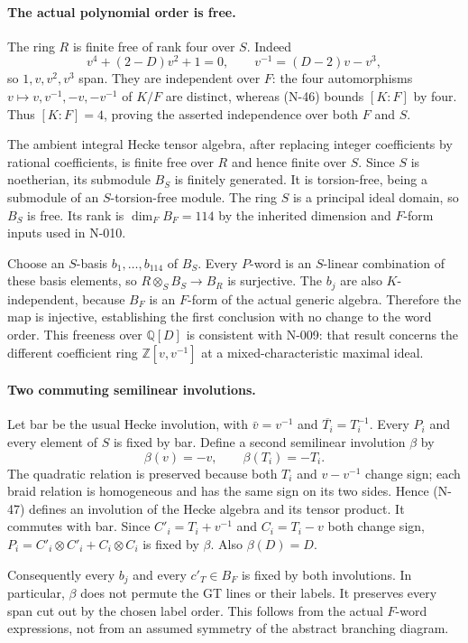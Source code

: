\paragraph{The actual polynomial order is free.}
The ring $R$ is finite free of rank four over $S$.  Indeed
\[
 v^4+(2-D)v^2+1=0,\qquad
 v^{-1}=(D-2)v-v^3,
 \tag{N-46}
\]
so $1,v,v^2,v^3$ span.  They are independent over $F$: the four
automorphisms $v\mapsto v,v^{-1},-v,-v^{-1}$ of $K/F$ are distinct,
whereas (N-46) bounds $[K:F]$ by four.  Thus $[K:F]=4$, proving
the asserted independence over both $F$ and $S$.

The ambient integral Hecke tensor algebra, after replacing
integer coefficients by rational coefficients, is finite free
over $R$ and hence finite over $S$.  Since $S$ is noetherian,
its submodule $B_S$ is finitely generated.  It is torsion-free,
being a submodule of an $S$-torsion-free module.  The ring $S$
is a principal ideal domain, so $B_S$ is free.  Its rank is
$\dim_F B_F=114$ by the inherited dimension and $F$-form inputs
used in N-010.

Choose an $S$-basis $b_1,\ldots,b_{114}$ of $B_S$.  Every $P$-word
is an $S$-linear combination of these basis elements, so
$R\otimes_S B_S\to B_R$ is surjective.  The $b_j$ are also
$K$-independent, because $B_F$ is an $F$-form of the actual
generic algebra.  Therefore the map is injective, establishing
the first conclusion with no change to the word order.
This freeness over $\mathbb Q[D]$ is consistent with N-009:
that result concerns the different coefficient ring
$\mathbb Z[v,v^{-1}]$ at a mixed-characteristic maximal ideal.

\paragraph{Two commuting semilinear involutions.}
Let bar be the usual Hecke involution, with $\bar v=v^{-1}$
and $\overline{T_i}=T_i^{-1}$.  Every $P_i$ and every element
of $S$ is fixed by bar.  Define a second semilinear involution
$\beta$ by
\[
             \beta(v)=-v,\qquad \beta(T_i)=-T_i.
 \tag{N-47}
\]
The quadratic relation is preserved because both $T_i$ and
$v-v^{-1}$ change sign; each braid relation is homogeneous
and has the same sign on its two sides.  Hence (N-47) defines
an involution of the Hecke algebra and its tensor product.
It commutes with bar.  Since $C'_i=T_i+v^{-1}$ and
$C_i=T_i-v$ both change sign, $P_i=C'_i\otimes C'_i+C_i\otimes C_i$
is fixed by $\beta$.  Also $\beta(D)=D$.

Consequently every $b_j$ and every $c'_T\in B_F$ is fixed
by both involutions.  In particular, $\beta$ does not permute
the GT lines or their labels.  It preserves every span cut out
by the chosen label order.  This follows from the actual
$F$-word expressions, not from an assumed symmetry of the
abstract branching diagram.

